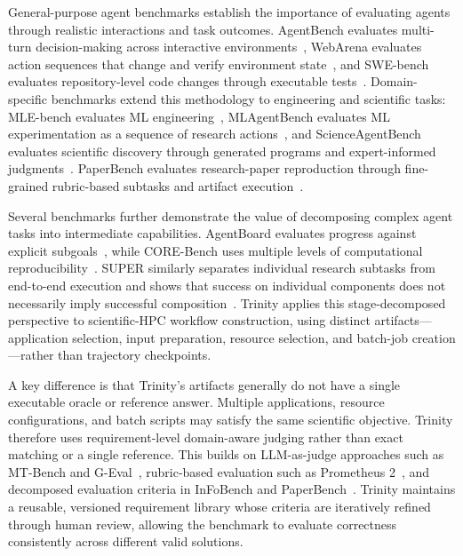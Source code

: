 \documentclass[conference]{IEEEtran}
\begin{document}
General-purpose agent benchmarks establish the importance of evaluating agents through realistic interactions and task outcomes. AgentBench evaluates multi-turn decision-making across interactive environments~\cite{liu2023agentbench}, WebArena evaluates action sequences that change and verify environment state~\cite{zhou2024webarena}, and SWE-bench evaluates repository-level code changes through executable tests~\cite{jimenez2024swebench}. Domain-specific benchmarks extend this methodology to engineering and scientific tasks: MLE-bench evaluates ML engineering~\cite{chan2025mlebench}, MLAgentBench evaluates ML experimentation as a sequence of research actions~\cite{huang2024mlagentbench}, and ScienceAgentBench evaluates scientific discovery through generated programs and expert-informed judgments~\cite{chen2025scienceagentbench}. PaperBench evaluates research-paper reproduction through fine-grained rubric-based subtasks and artifact execution~\cite{starace2025paperbench}.

Several benchmarks further demonstrate the value of decomposing complex agent tasks into intermediate capabilities. AgentBoard evaluates progress against explicit subgoals~\cite{ma2024agentboard}, while CORE-Bench uses multiple levels of computational reproducibility~\cite{siegel2024corebench}. SUPER similarly separates individual research subtasks from end-to-end execution and shows that success on individual components does not necessarily imply successful composition~\cite{bogin2024super}. Trinity applies this stage-decomposed perspective to scientific-HPC workflow construction, using distinct artifacts---application selection, input preparation, resource selection, and batch-job creation---rather than trajectory checkpoints.

A key difference is that Trinity's artifacts generally do not have a single executable oracle or reference answer. Multiple applications, resource configurations, and batch scripts may satisfy the same scientific objective. Trinity therefore uses requirement-level domain-aware judging rather than exact matching or a single reference. This builds on LLM-as-judge approaches such as MT-Bench and G-Eval~\cite{zheng2023mtbench,liu2023geval}, rubric-based evaluation such as Prometheus 2~\cite{kim2024prometheus2}, and decomposed evaluation criteria in InFoBench and PaperBench~\cite{qin2024infobench,starace2025paperbench}. Trinity maintains a reusable, versioned requirement library whose criteria are iteratively refined through human review, allowing the benchmark to evaluate correctness consistently across different valid solutions.
\end{document}
